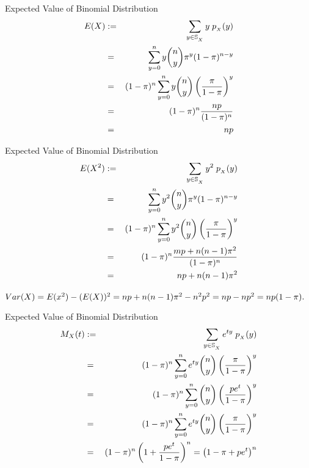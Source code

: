 \documentclass[compress]{beamer}
\begin{document}
\begin{frame}{Expected Value of Binomial Distribution}
\begin{eqnarray}
E(X)& := &  \sum_{y\in \support[X]} y\; \pmf_{_X}(y) \nonumber\\
& = &  \sum_{y=0}^{n} y {n\choose y}\binP^y(1-\binP)^{n-y}  \nonumber\\
& =& (1-\binP)^{n}  \sum_{y=0}^{n}  y {n\choose y}\left( \frac{\binP}{1-\binP}\right)^y   \nonumber\\
& =& (1-\binP)^{n}  \frac{np}{(1-\binP)^n} \nonumber\\
& =& np
\end{eqnarray}

\end{frame}


\begin{frame}{Expected Value of Binomial Distribution}
\begin{eqnarray}
E(X^2)& := &  \sum_{y\in \support[X]} y^2\; \pmf_{_X}(y) \nonumber\\
& = &  \sum_{y=0}^{n} y^2 {n\choose y}\binP^y(1-\binP)^{n-y}  \nonumber\\
& =& (1-\binP)^{n}  \sum_{y=0}^{n}  y^2 {n\choose y}\left( \frac{\binP}{1-\binP}\right)^y   \nonumber\\
& =& (1-\binP)^{n}  \frac{mp+ n(n-1)\binP^2}{(1-\binP)^n} \nonumber\\
& =& np+ n(n-1)\binP^2
\end{eqnarray}

$Var(X)= E(x^2)- (E(X))^2= np+n(n-1)\pi^2- n^2p^2= np-np^2= np(1-\pi). $

\end{frame}



\begin{frame}{Expected Value of Binomial Distribution}
\begin{eqnarray}
M_X(t)& := &  \sum_{y\in \support[X]} e^{ty}\; \pmf_{_X}(y) \nonumber\\
& =& (1-\binP)^{n}  \sum_{y=0}^{n}  e^{ty} {n\choose y}\left( \frac{\binP}{1-\binP}\right)^y   \nonumber\\
& =& (1-\binP)^{n}  \sum_{y=0}^{n}  {n\choose y}\left( \frac{pe^{t}}{1-\binP}\right)^y   \nonumber\\
& =& (1-\binP)^{n}  \sum_{y=0}^{n}  e^{ty} {n\choose y}\left( \frac{\binP}{1-\binP}\right)^y   \nonumber\\
& =& (1-\binP)^{n} \left( 1+  \frac{pe^t}{1-\binP} \right)^n = \left( 1-\binP+pe^t\right)^n  \nonumber\\
\end{eqnarray}



\end{frame}
\end{document}
